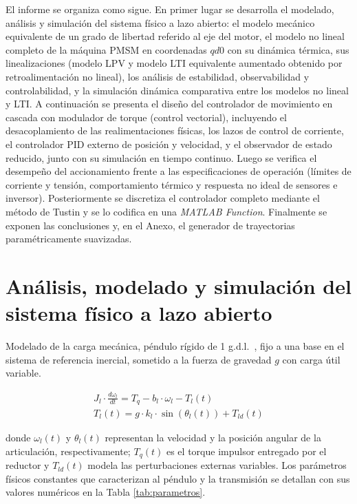 \documentclass[12pt, a4paper,journal, onecolumn, compsoc]{IEEEtran}
\begin{document}
El informe se organiza como sigue. En primer lugar se desarrolla el modelado, análisis y simulación del sistema físico a lazo abierto: el modelo mecánico equivalente de un grado de libertad referido al eje del motor, el modelo no lineal completo de la máquina PMSM en coordenadas $qd0$ con su dinámica térmica, sus linealizaciones (modelo LPV y modelo LTI equivalente aumentado obtenido por retroalimentación no lineal), los análisis de estabilidad, observabilidad y controlabilidad, y la simulación dinámica comparativa entre los modelos no lineal y LTI. A continuación se presenta el diseño del controlador de movimiento en cascada con modulador de torque (control vectorial), incluyendo el desacoplamiento de las realimentaciones físicas, los lazos de control de corriente, el controlador PID externo de posición y velocidad, y el observador de estado reducido, junto con su simulación en tiempo continuo. Luego se verifica el desempeño del accionamiento frente a las especificaciones de operación (límites de corriente y tensión, comportamiento térmico y respuesta no ideal de sensores e inversor). Posteriormente se discretiza el controlador completo mediante el método de Tustin y se lo codifica en una \textit{MATLAB Function}. Finalmente se exponen las conclusiones y, en el Anexo, el generador de trayectorias paramétricamente suavizadas.

\section{Análisis, modelado y simulación del sistema físico a lazo abierto}
Modelado de la carga mecánica, péndulo rígido de 1 g.d.l.~\cite{kelly_robot}, fijo a una base en el sistema de referencia inercial, sometido a la fuerza de gravedad \(g\) con carga útil variable.

\begin{align}
    J_l\cdot \frac{d\omega_l}{dt} = T_q - b_l\cdot \omega_l - T_l(t)  \\
    T_l(t) = g\cdot k_l \cdot \sin(\theta_l(t)) + T_{ld}(t)
\end{align}

donde $\omega_l(t)$ y $\theta_l(t)$ representan la velocidad y la posición angular de la articulación, respectivamente; $T_q(t)$ es el torque impulsor entregado por el reductor y $T_{ld}(t)$ modela las perturbaciones externas variables. Los parámetros físicos constantes que caracterizan al péndulo y la transmisión se detallan con sus valores numéricos en la Tabla \ref{tab:parametros}.
\end{document}
